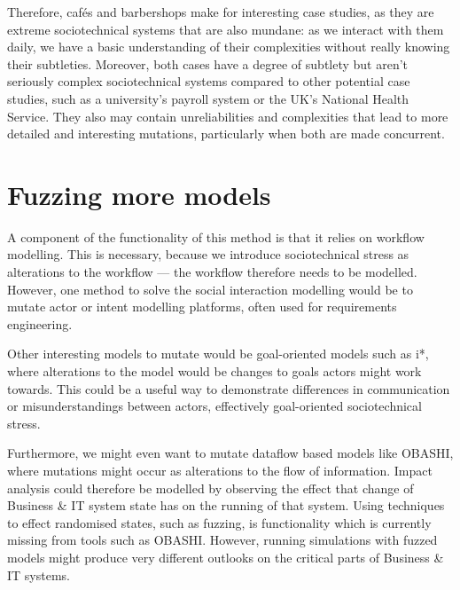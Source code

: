 Therefore, cafés and barbershops make for interesting case studies, as they are extreme sociotechnical systems that are also mundane: as we interact with them daily, we have a basic understanding of their complexities without really knowing their subtleties. Moreover, both cases have a degree of subtlety but aren't seriously complex sociotechnical systems compared to other potential case studies, such as a university's payroll system or the UK's National Health Service. They also may contain unreliabilities and complexities that lead to more detailed and interesting mutations, particularly when both are made concurrent. \par



\section{Fuzzing more models}
\label{fuzzing_more_models}
A component of the functionality of this method is that it relies on workflow modelling. This is necessary, because we introduce sociotechnical stress as alterations to the workflow --- the workflow therefore needs to be modelled. However, one method to solve the social interaction modelling would be to mutate actor or intent modelling platforms, often used for requirements engineering. \par

Other interesting models to mutate would be goal-oriented models such as i*\cite{Yu2009}, where alterations to the model would be changes to goals actors might work towards. This could be a useful way to demonstrate differences in communication or misunderstandings between actors, effectively goal-oriented sociotechnical stress. \par

Furthermore, we might even want to mutate dataflow based models like OBASHI\cite{ObashiMethodology}, where mutations might occur as alterations to the flow of information. Impact analysis\cite{Bohner96softwarechange} could therefore be modelled by observing the effect that change of Business \& IT system state has on the running of that system. Using techniques to effect randomised states, such as fuzzing, is functionality which is currently missing from tools such as OBASHI. However, running simulations with fuzzed models might produce very different outlooks on the critical parts of Business \& IT systems.  \par

